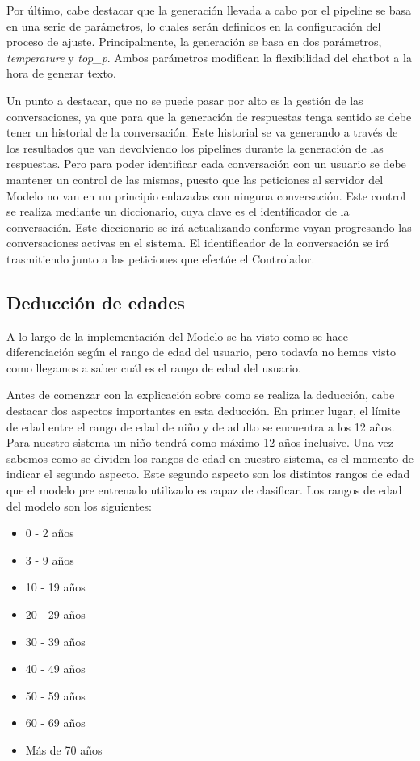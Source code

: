 Por último, cabe destacar que la generación llevada a cabo por el pipeline se basa en una serie de parámetros, lo cuales serán definidos en la configuración del proceso de ajuste. Principalmente, la generación se basa en dos parámetros, \textit{temperature} y \textit{top\_p}. Ambos parámetros modifican la flexibilidad del chatbot a la hora de generar texto.

Un punto a destacar, que no se puede pasar por alto es la gestión de las conversaciones, ya que para que la generación de respuestas tenga sentido se debe tener un historial de la conversación. Este historial se va generando a través de los resultados que van devolviendo los pipelines durante la generación de las respuestas. Pero para poder identificar cada conversación con un usuario se debe mantener un control de las mismas, puesto que las peticiones al servidor del Modelo no van en un principio enlazadas con ninguna conversación. Este control se realiza mediante un diccionario, cuya clave es el identificador de la conversación. Este diccionario se irá actualizando conforme vayan progresando las conversaciones activas en el sistema. El identificador de la conversación se irá trasmitiendo junto a las peticiones que efectúe el Controlador.

\subsection{Deducción de edades}

A lo largo de la implementación del Modelo se ha visto como se hace diferenciación según el rango de edad del usuario, pero todavía no hemos visto como llegamos a saber cuál es el rango de edad del usuario.

Antes de comenzar con la explicación sobre como se realiza la deducción, cabe destacar dos aspectos importantes en esta deducción. En primer lugar, el límite de edad entre el rango de edad de niño y de adulto se encuentra a los 12 años. Para nuestro sistema un niño tendrá como máximo 12 años inclusive. Una vez sabemos como se dividen los rangos de edad en nuestro sistema, es el momento de indicar el segundo aspecto. Este segundo aspecto son los distintos rangos de edad que el modelo pre entrenado utilizado es capaz de clasificar. Los rangos de edad del modelo son los siguientes:

\begin{itemize}
\item 0 - 2 años
\item 3 - 9 años
\item 10 - 19 años
\item 20 - 29 años
\item 30 - 39 años
\item 40 - 49 años
\item 50 - 59 años
\item 60 - 69 años
\item Más de 70 años
\end{itemize}

